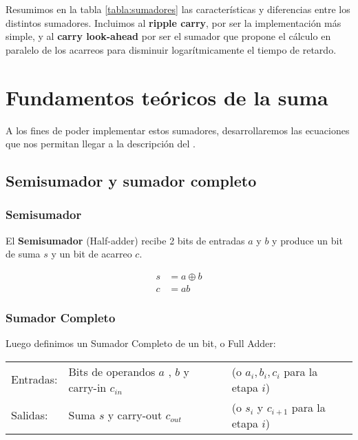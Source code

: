 

Resumimos en la tabla \ref{tabla:sumadores} las características y diferencias entre los distintos sumadores\cite{6120598}. Incluimos al \textbf{ripple carry}, por ser la implementación más simple, y al \textbf{carry look-ahead} por ser el sumador que propone el cálculo en paralelo de los acarreos para disminuir logarítmicamente el tiempo de retardo.







\section{Fundamentos teóricos de la suma}
A los fines de poder implementar estos sumadores, desarrollaremos las ecuaciones que nos permitan llegar a la descripción del .

\subsection{Semisumador y sumador completo}
\subsubsection{Semisumador}
El {\bf Semisumador} (Half-adder) recibe 2 bits de entradas \(a\) y \(b\) y produce un bit de suma \(s\) y un bit de acarreo \(c\).

\begin{subequations}
\begin{align}
s &= a \oplus b\\
c &= ab
\end{align}
\end{subequations}

\subsubsection{Sumador Completo}
Luego definimos un Sumador Completo de un bit, o Full Adder:
\begin{center}
\begin{tabular}{lll}
Entradas: & Bits de operandos \(a\) , \(b\) y carry-in \(c_{in}\) & (o \(a_i, b_i, c_i\) para la etapa \(i\)) \\
Salidas: & Suma \(s\) y carry-out \(c_{out}\) & (o \(s_i\) y \(c_{i+1}\) para la etapa \(i\)) \\
\end{tabular}
\end{center}

